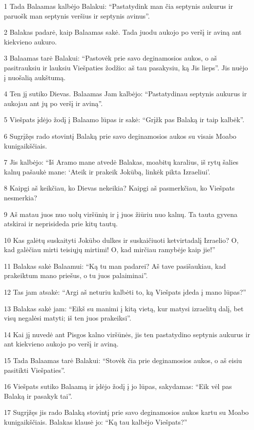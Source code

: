 \par 1 Tada Balaamas kalbėjo Balakui: “Pastatydink man čia septynis aukurus ir paruošk man septynis veršius ir septynis avinus”. 
\par 2 Balakas padarė, kaip Balaamas sakė. Tada juodu aukojo po veršį ir aviną ant kiekvieno aukuro. 
\par 3 Balaamas tarė Balakui: “Pastovėk prie savo deginamosios aukos, o aš pasitrauksiu ir lauksiu Viešpaties žodžio: aš tau pasakysiu, ką Jis lieps”. Jis nuėjo į nuošalią aukštumą. 
\par 4 Ten jį sutiko Dievas. Balaamas Jam kalbėjo: “Pastatydinau septynis aukurus ir aukojau ant jų po veršį ir aviną”. 
\par 5 Viešpats įdėjo žodį į Balaamo lūpas ir sakė: “Grįžk pas Balaką ir taip kalbėk”. 
\par 6 Sugrįžęs rado stovintį Balaką prie savo deginamosios aukos su visais Moabo kunigaikščiais. 
\par 7 Jis kalbėjo: “Iš Aramo mane atvedė Balakas, moabitų karalius, iš rytų šalies kalnų pašaukė mane: ‘Ateik ir prakeik Jokūbą, linkėk pikta Izraeliui’. 
\par 8 Kaipgi aš keikčiau, ko Dievas nekeikia? Kaipgi aš pasmerkčiau, ko Viešpats nesmerkia? 
\par 9 Aš matau juos nuo uolų viršūnių ir į juos žiūriu nuo kalnų. Ta tauta gyvena atskirai ir neprisideda prie kitų tautų. 
\par 10 Kas galėtų suskaityti Jokūbo dulkes ir suskaičiuoti ketvirtadalį Izraelio? O, kad galėčiau mirti teisiųjų mirtimi! O, kad mirčiau ramybėje kaip jie!” 
\par 11 Balakas sakė Balaamui: “Ką tu man padarei? Aš tave pasišaukiau, kad prakeiktum mano priešus, o tu juos palaiminai”. 
\par 12 Tas jam atsakė: “Argi aš neturiu kalbėti to, ką Viešpats įdeda į mano lūpas?” 
\par 13 Balakas sakė jam: “Eikš su manimi į kitą vietą, kur matysi izraelitų dalį, bet visų negalėsi matyti; iš ten juos prakeiksi”. 
\par 14 Kai jį nuvedė ant Pisgos kalno viršūnės, jis ten pastatydino septynis aukurus ir ant kiekvieno aukojo po veršį ir aviną. 
\par 15 Tada Balaamas tarė Balakui: “Stovėk čia prie deginamosios aukos, o aš eisiu pasitikti Viešpaties”. 
\par 16 Viešpats sutiko Balaamą ir įdėjo žodį į jo lūpas, sakydamas: “Eik vėl pas Balaką ir pasakyk tai”. 
\par 17 Sugrįžęs jis rado Balaką stovintį prie savo deginamosios aukos kartu su Moabo kunigaikščiais. Balakas klausė jo: “Ką tau kalbėjo Viešpats?” 
